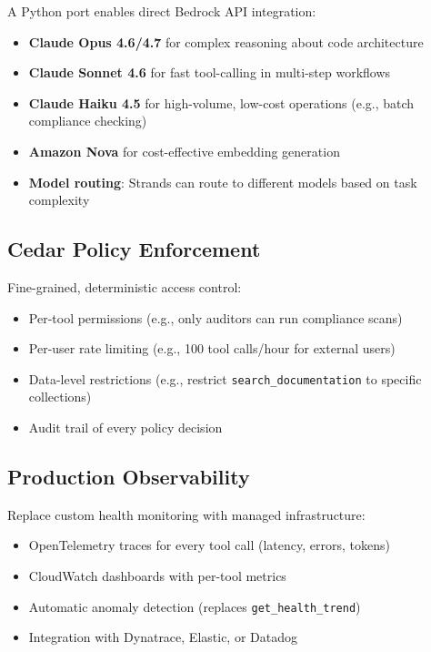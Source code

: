\documentclass[11pt,letterpaper]{article}
\begin{document}
A Python port enables direct Bedrock API integration:

\begin{itemize}[noitemsep]
    \item \textbf{Claude Opus 4.6/4.7} for complex reasoning about code
          architecture
    \item \textbf{Claude Sonnet 4.6} for fast tool-calling in multi-step
          workflows
    \item \textbf{Claude Haiku 4.5} for high-volume, low-cost operations
          (e.g., batch compliance checking)
    \item \textbf{Amazon Nova} for cost-effective embedding generation
    \item \textbf{Model routing}: Strands can route to different models
          based on task complexity
\end{itemize}

\subsection{Cedar Policy Enforcement}

Fine-grained, deterministic access control:

\begin{itemize}[noitemsep]
    \item Per-tool permissions (e.g., only auditors can run compliance scans)
    \item Per-user rate limiting (e.g., 100 tool calls/hour for external users)
    \item Data-level restrictions (e.g., restrict \texttt{search\_documentation}
          to specific collections)
    \item Audit trail of every policy decision
\end{itemize}

\subsection{Production Observability}

Replace custom health monitoring with managed infrastructure:

\begin{itemize}[noitemsep]
    \item OpenTelemetry traces for every tool call (latency, errors, tokens)
    \item CloudWatch dashboards with per-tool metrics
    \item Automatic anomaly detection (replaces \texttt{get\_health\_trend})
    \item Integration with Dynatrace, Elastic, or Datadog
\end{itemize}
\end{document}
